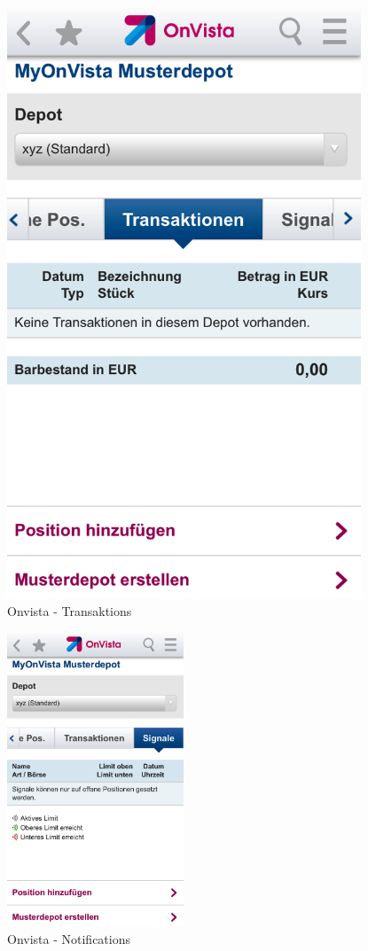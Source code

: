 \begin{figure}[H]
\begin{minipage}[b]{.5\linewidth}
        \centering\includegraphics[width=0.94\textwidth]{img/screenshots/ex5p4.png}
    \end{minipage}
	\captionsetup{labelformat=empty}
    \caption[]{Onvista - Transaktions}
\end{figure}
\begin{figure}[H] 
        \centering\includegraphics[width=0.47\textwidth]{img/screenshots/ex5p5.png}
	\captionsetup{labelformat=empty}
        \caption[]{Onvista - Notifications}
\end{figure}
